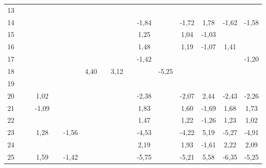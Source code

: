 \documentclass[a4paper, 11pt]{article}
\begin{document}
\begin{multicols}{2}
\begin{table}[h]
{\begin{tabular}{|c|c c|c|c c|c c|c c|c|c c|c|cc|}
13 &  &  &  &  &  &  &  &  &  &  &  &  &  &  &  \\
14 &  &  &  &  &  &  &  &  &  & \cellcolor[HTML]{B4F5F2}-1,84 &  & \cellcolor[HTML]{B4F5F2}-1,72 & \cellcolor[HTML]{FDFF89}1,78 & \cellcolor[HTML]{B4F5F2}-1,62 & \cellcolor[HTML]{B4F5F2}-1,58 \\
15 &  &  &  &  &  &  &  &  &  & \cellcolor[HTML]{FDFF89}1,25 &  & \cellcolor[HTML]{FDFF89}1,04 & \cellcolor[HTML]{B4F5F2}-1,03 &  &  \\
16 &  &  &  &  &  &  &  &  &  & \cellcolor[HTML]{FDFF89}1,48 &  & \cellcolor[HTML]{FDFF89}1,19 & \cellcolor[HTML]{B4F5F2}-1,07 & \cellcolor[HTML]{FDFF89}1,41 &  \\
17 &  &  &  &  &  &  &  &  &  & \cellcolor[HTML]{B4F5F2}-1,42 &  &  &  &  & \cellcolor[HTML]{B4F5F2}-1,20 \\
18 &  &  &  &  &  & \cellcolor[HTML]{FFC702}4,40 &  & \cellcolor[HTML]{FFC702}3,12 &  &  & \cellcolor[HTML]{6F94FF}-5,25 &  &  &  &  \\
19 &  &  &  &  &  &  &  &  &  &  &  &  &  &  &  \\
20 &  &  & \cellcolor[HTML]{FDFF89}1,02 &  &  &  &  &  &  & \cellcolor[HTML]{B4F5F2}-2,38 &  & \cellcolor[HTML]{B4F5F2}-2,07 & \cellcolor[HTML]{FDFF89}2,44 & \cellcolor[HTML]{B4F5F2}-2,43 & \cellcolor[HTML]{B4F5F2}-2,26 \\
21 &  &  & \cellcolor[HTML]{B4F5F2}-1,09 &  &  &  &  &  &  & \cellcolor[HTML]{FDFF89}1,83 &  & \cellcolor[HTML]{FDFF89}1,60 & \cellcolor[HTML]{B4F5F2}-1,69 & \cellcolor[HTML]{FDFF89}1,68 & \cellcolor[HTML]{FDFF89}1,73 \\
22 &  &  &  &  &  &  &  &  &  & \cellcolor[HTML]{FDFF89}1,47 &  & \cellcolor[HTML]{FDFF89}1,22 & \cellcolor[HTML]{B4F5F2}-1,26 & \cellcolor[HTML]{FDFF89}1,23 & \cellcolor[HTML]{FDFF89}1,02 \\
23 &  &  & \cellcolor[HTML]{FDFF89}1,28 &  & \cellcolor[HTML]{B4F5F2}-1,56 &  &  &  &  & \cellcolor[HTML]{4AD7FF}-4,53 &  & \cellcolor[HTML]{4AD7FF}-4,22 & \cellcolor[HTML]{F56B00}5,19 & \cellcolor[HTML]{6F94FF}-5,27 & \cellcolor[HTML]{4AD7FF}-4,91 \\
24 &  &  &  &  &  &  &  &  &  & \cellcolor[HTML]{FDFF89}2,19 &  & \cellcolor[HTML]{FDFF89}1,93 & \cellcolor[HTML]{B4F5F2}-1,61 & \cellcolor[HTML]{FDFF89}2,22 & \cellcolor[HTML]{FDFF89}2,09 \\
25 &  &  & \cellcolor[HTML]{FDFF89}1,59 &  & \cellcolor[HTML]{B4F5F2}-1,42 &  &  &  &  & \cellcolor[HTML]{6F94FF}-5,75 &  & \cellcolor[HTML]{6F94FF}-5,21 & \cellcolor[HTML]{F56B00}5,58 & \cellcolor[HTML]{6F94FF}-6,35 & \cellcolor[HTML]{6F94FF}-5,25 \\

\end{tabular}}
\end{table}
\end{multicols}
\end{document}
